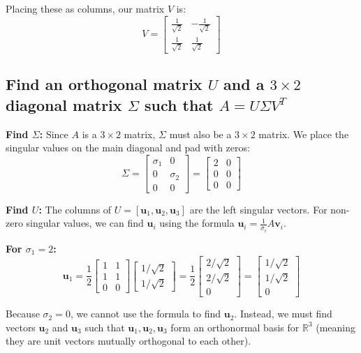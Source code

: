 Placing these as columns, our matrix $V$ is:
\[
	V = \begin{bmatrix} \frac{1}{\sqrt{2}} & -\frac{1}{\sqrt{2}} \\ \frac{1}{\sqrt{2}} & \frac{1}{\sqrt{2}} \end{bmatrix}
\]

\subsection{Find an orthogonal matrix $U$ and a $3 \times 2$ diagonal matrix $\Sigma$ such that $A = U\Sigma V^T$}

\textbf{Find $\Sigma$:}
Since $A$ is a $3 \times 2$ matrix, $\Sigma$ must also be a $3 \times 2$ matrix. We place the singular values on the main diagonal and pad with zeros:
\[
	\Sigma = \begin{bmatrix} \sigma_1 & 0 \\ 0 & \sigma_2 \\ 0 & 0 \end{bmatrix} = \begin{bmatrix} 2 & 0 \\ 0 & 0 \\ 0 & 0 \end{bmatrix}
\]

\textbf{ Find $U$:}
The columns of $U = [\mathbf{u}_1, \mathbf{u}_2, \mathbf{u}_3]$ are the left singular vectors. For non-zero singular values, we can find $\mathbf{u}_i$ using the formula $\mathbf{u}_i = \frac{1}{\sigma_i} A \mathbf{v}_i$.

\textbf{For $\sigma_1 = 2$:}
\[
	\mathbf{u}_1 = \frac{1}{2} \begin{bmatrix} 1 & 1 \\ 1 & 1 \\ 0 & 0 \end{bmatrix} \begin{bmatrix} 1/\sqrt{2} \\ 1/\sqrt{2} \end{bmatrix} = \frac{1}{2} \begin{bmatrix} 2/\sqrt{2} \\ 2/\sqrt{2} \\ 0 \end{bmatrix} = \begin{bmatrix} 1/\sqrt{2} \\ 1/\sqrt{2} \\ 0 \end{bmatrix}
\]

Because $\sigma_2 = 0$, we cannot use the formula to find $\mathbf{u}_2$. Instead, we must find vectors $\mathbf{u}_2$ and $\mathbf{u}_3$ such that $\mathbf{u}_1, \mathbf{u}_2, \mathbf{u}_3$ form an orthonormal basis for $\mathbb{R}^3$ (meaning they are unit vectors mutually orthogonal to each other).

